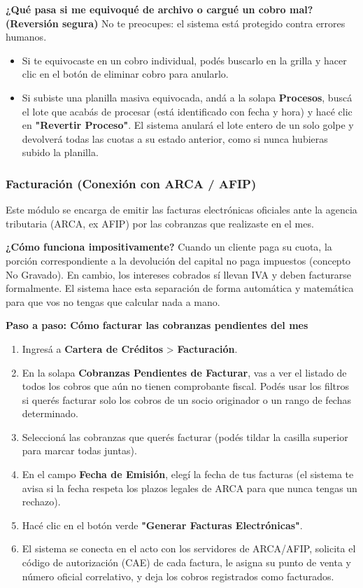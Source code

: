 \documentclass[12pt,a4paper]{article}
\renewcommand{\_}{\textunderscore\allowbreak}
\begin{document}
\textbf{¿Qué pasa si me equivoqué de archivo o cargué un cobro mal? (Reversión segura)}
No te preocupes: el sistema está protegido contra errores humanos.
\begin{itemize}
    \item Si te equivocaste en un cobro individual, podés buscarlo en la grilla y hacer clic en el botón de eliminar cobro para anularlo.
    \item Si subiste una planilla masiva equivocada, andá a la solapa \textbf{Procesos}, buscá el lote que acabás de procesar (está identificado con fecha y hora) y hacé clic en \textbf{"Revertir Proceso"}. El sistema anulará el lote entero de un solo golpe y devolverá todas las cuotas a su estado anterior, como si nunca hubieras subido la planilla.
\end{itemize}

\subsubsection{Facturación (Conexión con ARCA / AFIP)}
Este módulo se encarga de emitir las facturas electrónicas oficiales ante la agencia tributaria (ARCA, ex AFIP) por las cobranzas que realizaste en el mes.

\textbf{¿Cómo funciona impositivamente?}
Cuando un cliente paga su cuota, la porción correspondiente a la devolución del capital no paga impuestos (concepto No Gravado). En cambio, los intereses cobrados sí llevan IVA y deben facturarse formalmente. El sistema hace esta separación de forma automática y matemática para que vos no tengas que calcular nada a mano.

\textbf{Paso a paso: Cómo facturar las cobranzas pendientes del mes}
\begin{enumerate}
    \item Ingresá a \textbf{Cartera de Créditos} > \textbf{Facturación}.
    \item En la solapa \textbf{Cobranzas Pendientes de Facturar}, vas a ver el listado de todos los cobros que aún no tienen comprobante fiscal. Podés usar los filtros si querés facturar solo los cobros de un socio originador o un rango de fechas determinado.
    \item Seleccioná las cobranzas que querés facturar (podés tildar la casilla superior para marcar todas juntas).
    \item En el campo \textbf{Fecha de Emisión}, elegí la fecha de tus facturas (el sistema te avisa si la fecha respeta los plazos legales de ARCA para que nunca tengas un rechazo).
    \item Hacé clic en el botón verde \textbf{"Generar Facturas Electrónicas"}.
    \item El sistema se conecta en el acto con los servidores de ARCA/AFIP, solicita el código de autorización (CAE) de cada factura, le asigna su punto de venta y número oficial correlativo, y deja los cobros registrados como facturados.
\end{enumerate}
\end{document}
